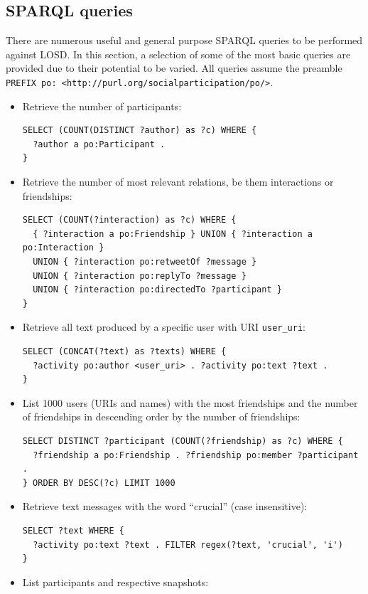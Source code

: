 \documentclass[data,datadescriptor,submit,moreauthors,pdftex]{Definitions/mdpi}
\newcommand{\te}[1] {\texttt{\footnotesize#1}}
\begin{document}
\subsection{SPARQL queries}\label{queries}
There are numerous useful and general purpose SPARQL queries to be performed against LOSD.
In this section, a selection of some of the most basic queries are provided due to their potential to be varied.
All queries assume the preamble \te{PREFIX po: <http://purl.org/socialparticipation/po/>}.
\begin{itemize}
  \item Retrieve the number of participants:
\begin{lstlisting}[language=spq]
SELECT (COUNT(DISTINCT ?author) as ?c) WHERE {
  ?author a po:Participant . 
}
\end{lstlisting}
  \item Retrieve the number of most relevant relations, be them interactions or
      friendships:
\begin{lstlisting}[language=spq]
SELECT (COUNT(?interaction) as ?c) WHERE {
  { ?interaction a po:Friendship } UNION { ?interaction a po:Interaction }
  UNION { ?interaction po:retweetOf ?message }
  UNION { ?interaction po:replyTo ?message }
  UNION { ?interaction po:directedTo ?participant }
}
\end{lstlisting}
            \item Retrieve all text produced by a specific user with URI \te{user\_uri}:
\begin{lstlisting}[language=spq]
SELECT (CONCAT(?text) as ?texts) WHERE {
  ?activity po:author <user_uri> . ?activity po:text ?text .
}
\end{lstlisting}
  \item List 1000 users (URIs and names) with the most friendships and the number of
      friendships in descending order by the number of friendships:
\begin{lstlisting}[language=spq]
SELECT DISTINCT ?participant (COUNT(?friendship) as ?c) WHERE {
  ?friendship a po:Friendship . ?friendship po:member ?participant . 
} ORDER BY DESC(?c) LIMIT 1000
\end{lstlisting}
  \item Retrieve text messages with the word ``crucial'' (case insensitive):
\begin{lstlisting}[language=spq]
SELECT ?text WHERE { 
  ?activity po:text ?text . FILTER regex(?text, 'crucial', 'i')
}
\end{lstlisting}
  \item List participants and respective snapshots:

\end{itemize}
\end{document}
